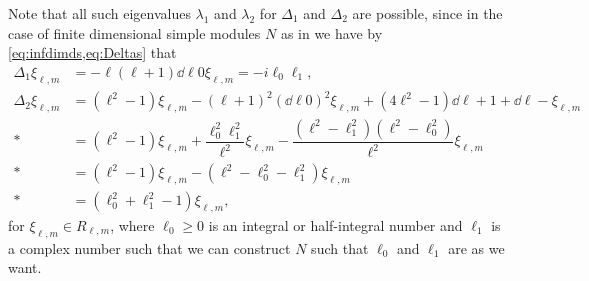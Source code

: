 Note that all such eigenvalues $\lambda_1$ and $\lambda_2$ for $\Delta_1$ and $\Delta_2$ are possible, since in the case of finite dimensional simple modules $N$ as in  we have by \cref{eq:infdimds,eq:Deltas} that
\begin{align*}
  \Delta_1 \xi_{\ell,m} &= -\ell(\ell+1)\dd{\ell}{0}\xi_{\ell,m} = -i\ell_0\ell_1, \\
  \Delta_2 \xi_{\ell,m} &= (\ell^2-1)\xi_{\ell,m} - (\ell+1)^2(\dd{\ell}{0})^2\xi_{\ell,m} + (4\ell^2-1)\dd{\ell+1}{+}\dd{\ell}{-}\xi_{\ell,m} \\*
                        &= (\ell^2-1)\xi_{\ell,m} + \dfrac{\ell_0^2\ell_1^2}{\ell^2}\xi_{\ell,m} - \dfrac{(\ell^2-\ell_1^2)(\ell^2-\ell_0^2)}{\ell^2} \xi_{\ell,m} \\*
                        &= (\ell^2-1)\xi_{\ell,m} - (\ell^2-\ell_0^2-\ell_1^2)\xi_{\ell,m} \\*
                        &= (\ell_0^2+\ell_1^2-1)\xi_{\ell,m},
\end{align*}
for $\xi_{\ell,m}\in R_{\ell,m}$, where $\ell_0\geq 0$ is an integral or half-integral number and $\ell_1$ is a complex number such that we can construct $N$ such that $\ell_0$ and $\ell_1$ are as we want.

